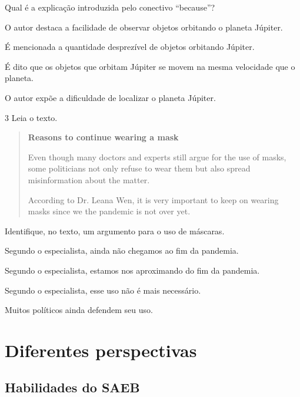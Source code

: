 Qual é a explicação introduzida pelo conectivo ``because''?

\begin{escolha}
\item O autor destaca a facilidade de observar objetos orbitando o planeta
Júpiter.

\item É mencionada a quantidade desprezível de objetos orbitando Júpiter.

\item É dito que os objetos que orbitam Júpiter se movem na mesma
velocidade que o planeta.

\item O autor expõe a dificuldade de localizar o planeta Júpiter.
\end{escolha}

\num{3} Leia o texto.


\begin{quote}
\textbf{Reasons to continue wearing a mask}

Even though many doctors and experts still argue for the use of masks, some politicians not only refuse to wear them but also spread misinformation about the matter.

According to Dr. Leana Wen, it is very important to keep on wearing masks since we the pandemic is not over yet. 

\end{quote}

Identifique, no texto, um argumento para o uso de máscaras.

\begin{escolha}
\item Segundo o especialista, ainda não chegamos ao fim da pandemia.

\item Segundo o especialista, estamos nos aproximando do fim da pandemia.

\item Segundo o especialista, esse uso não é mais necessário.

\item Muitos políticos ainda defendem seu uso.
\end{escolha}

\chapter{Diferentes perspectivas}


\section*{Habilidades do SAEB}


